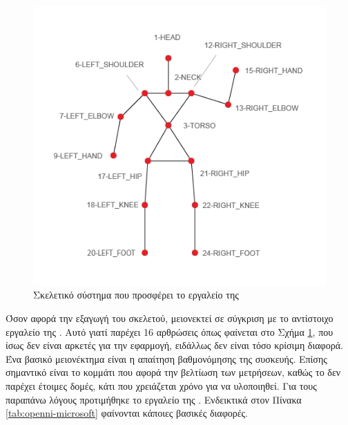 \begin{figure}[H]
    \centering
    \includegraphics[width=.7\textwidth, height=.35\textheight, keepaspectratio]{fig/openni-skeleton.png}
    \caption{Σκελετικό σύστημα που προσφέρει το εργαλείο της }
    \label{fig:openni-skeleton}
\end{figure}

Όσον αφορά την εξαγωγή του σκελετού, μειονεκτεί σε σύγκριση με το αντίστοιχο εργαλείο της . Αυτό γιατί παρέχει 16 αρθρώσεις όπως φαίνεται στο Σχήμα \ref{fig:openni-skeleton}, που ίσως δεν είναι αρκετές για την εφαρμογή, ειδάλλως δεν είναι τόσο κρίσιμη διαφορά. Ένα βασικό μειονέκτημα είναι η απαίτηση βαθμονόμησης της συσκευής. Επίσης σημαντικό είναι το κομμάτι που αφορά την βελτίωση των μετρήσεων, καθώς το  δεν παρέχει έτοιμες δομές, κάτι που χρειάζεται χρόνο για να υλοποιηθεί. Για τους παραπάνω λόγους προτιμήθηκε το εργαλείο της . Ενδεικτικά στον Πίνακα \ref{tab:openni-microsoft} φαίνονται κάποιες βασικές διαφορές.


